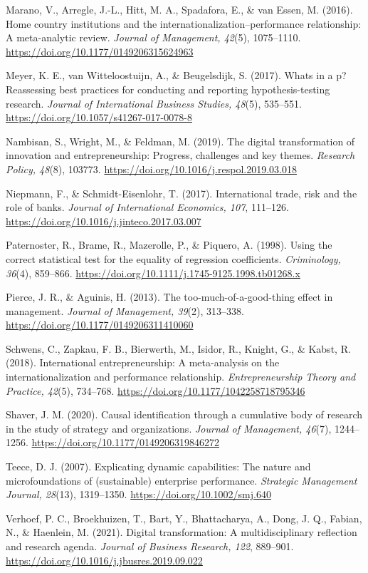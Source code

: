 \documentclass[12pt,a4paper]{article}
\begin{document}
Marano, V., Arregle, J.-L., Hitt, M. A., Spadafora, E., \& van Essen, M.
(2016). Home country institutions and the
internationalization--performance relationship: A meta-analytic review.
\emph{Journal of Management, 42}(5), 1075--1110.
\url{https://doi.org/10.1177/0149206315624963}

Meyer, K. E., van Witteloostuijn, A., \& Beugelsdijk, S. (2017).
What\textquotesingle s in a p? Reassessing best practices for conducting
and reporting hypothesis-testing research. \emph{Journal of
International Business Studies, 48}(5), 535--551.
\url{https://doi.org/10.1057/s41267-017-0078-8}

Nambisan, S., Wright, M., \& Feldman, M. (2019). The digital
transformation of innovation and entrepreneurship: Progress, challenges
and key themes. \emph{Research Policy, 48}(8), 103773.
\url{https://doi.org/10.1016/j.respol.2019.03.018}

Niepmann, F., \& Schmidt-Eisenlohr, T. (2017). International trade, risk
and the role of banks. \emph{Journal of International Economics, 107},
111--126. \url{https://doi.org/10.1016/j.jinteco.2017.03.007}

Paternoster, R., Brame, R., Mazerolle, P., \& Piquero, A. (1998). Using
the correct statistical test for the equality of regression
coefficients. \emph{Criminology, 36}(4), 859--866.
\url{https://doi.org/10.1111/j.1745-9125.1998.tb01268.x}

Pierce, J. R., \& Aguinis, H. (2013). The too-much-of-a-good-thing
effect in management. \emph{Journal of Management, 39}(2), 313--338.
\url{https://doi.org/10.1177/0149206311410060}

Schwens, C., Zapkau, F. B., Bierwerth, M., Isidor, R., Knight, G., \&
Kabst, R. (2018). International entrepreneurship: A meta-analysis on the
internationalization and performance relationship.
\emph{Entrepreneurship Theory and Practice, 42}(5), 734--768.
\url{https://doi.org/10.1177/1042258718795346}

Shaver, J. M. (2020). Causal identification through a cumulative body of
research in the study of strategy and organizations. \emph{Journal of
Management, 46}(7), 1244--1256.
\url{https://doi.org/10.1177/0149206319846272}

Teece, D. J. (2007). Explicating dynamic capabilities: The nature and
microfoundations of (sustainable) enterprise performance.
\emph{Strategic Management Journal, 28}(13), 1319--1350.
\url{https://doi.org/10.1002/smj.640}

Verhoef, P. C., Broekhuizen, T., Bart, Y., Bhattacharya, A., Dong, J.
Q., Fabian, N., \& Haenlein, M. (2021). Digital transformation: A
multidisciplinary reflection and research agenda. \emph{Journal of
Business Research, 122}, 889--901.
\url{https://doi.org/10.1016/j.jbusres.2019.09.022}
\end{document}
